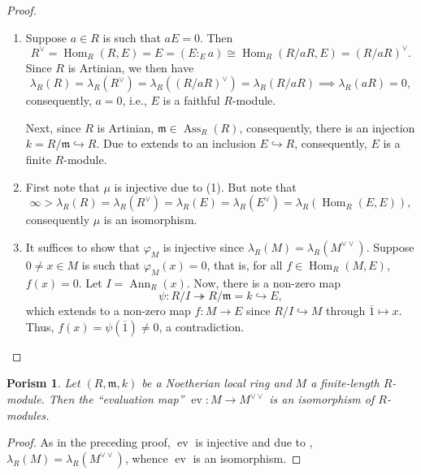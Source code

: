 \documentclass[10pt]{article}
\theoremstyle{thmstyle}
\theoremstyle{defstyle}
\newtheorem{porism}[theorem]{Porism}
\newcommand{\Ann}{\operatorname{Ann}}
\newcommand{\Hom}{\operatorname{Hom}}
\newcommand{\frakm}{\mathfrak{m}} %
\newcommand{\onto}{\twoheadrightarrow}
\newcommand{\into}{\hookrightarrow}
\newcommand{\ev}{\operatorname{ev}}
\newcommand{\Ass}{\operatorname{Ass}}
\begin{document}
\begin{proof}
\begin{enumerate}[label=(\arabic*)]
    \item Suppose $a\in R$ is such that $aE = 0$. Then 
    \begin{equation*}
        R^\vee = \Hom_R(R, E) = E = (E :_E a)\cong\Hom_R\left(R/aR, E\right) = \left(R/aR\right)^\vee.
    \end{equation*}
    Since $R$ is Artinian, we then have 
    \begin{equation*}
        \lambda_R(R) = \lambda_R(R^\vee) = \lambda_R\left((R/aR)^\vee\right) = \lambda_R(R/aR)\implies\lambda_R(aR) = 0, 
    \end{equation*}
    consequently, $a = 0$, i.e., $E$ is a faithful $R$-module.

    Next, since $R$ is Artinian, $\frakm\in\Ass_R(R)$, consequently, there is an injection $k = R/\frakm\into R$. Due to  extends to an inclusion $E\into R$, consequently, $E$ is a finite $R$-module.

    \item First note that $\mu$ is injective due to (1). But note that 
    \begin{equation*}
        \infty > \lambda_R(R) = \lambda_R(R^\vee) = \lambda_R(E) = \lambda_R(E^\vee) = \lambda_R\left(\Hom_R(E, E)\right),
    \end{equation*}
    consequently $\mu$ is an isomorphism.

    \item It suffices to show that $\varphi_M$ is injective since $\lambda_R(M) = \lambda_R(M^{\vee\vee})$. Suppose $0\ne x\in M$ is such that $\varphi_M(x) = 0$, that is, for all $f\in\Hom_R(M, E)$, $f(x) = 0$. Let $I = \Ann_R(x)$. Now, there is a non-zero map 
    \begin{equation*}
        \psi: R/I\onto R/\frakm = k\into E,
    \end{equation*}
    which extends to a non-zero map $f: M\to E$ since $R/I\into M$ through $\overline 1\mapsto x$. Thus, $f(x) = \psi(\overline 1)\ne 0$, a contradiction. \qedhere
\end{enumerate}
\end{proof}

\begin{porism}
    Let $(R,\frakm,k)$ be a Noetherian local ring and $M$ a finite-length $R$-module. Then the ``evaluation map'' $\ev: M\to M^{\vee\vee}$ is an isomorphism of $R$-modules.
\end{porism}
\begin{proof}
    As in the preceding proof, $\ev$ is injective and due to , $\lambda_R(M) = \lambda_R(M^{\vee\vee})$, whence $\ev$ is an isomorphism.
\end{proof}
\end{document}
